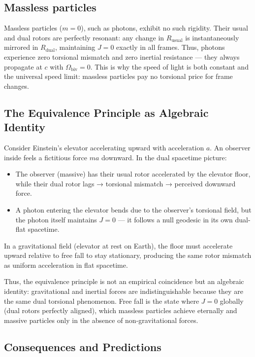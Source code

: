 \documentclass[dvipdfmx,a4paper]{article}
\begin{document}
\subsection{Massless particles}

Massless particles ($m = 0$), such as photons, exhibit no such rigidity. Their usual and dual rotors are perfectly resonant: any change in $R_\text{usual}$ is instantaneously mirrored in $R_\text{dual}$, maintaining $J = 0$ exactly in all frames. Thus, photons experience zero torsional mismatch and zero inertial resistance — they always propagate at $c$ with $\Omega_\text{biv} = 0$. This is why the speed of light is both constant and the universal speed limit: massless particles pay no torsional price for frame changes.

\subsection{The Equivalence Principle as Algebraic Identity}

Consider Einstein's elevator accelerating upward with acceleration $a$. An observer inside feels a fictitious force $ma$ downward. In the dual spacetime picture:

\begin{itemize}
\item The observer (massive) has their usual rotor accelerated by the elevator floor, while their dual rotor lags → torsional mismatch → perceived downward force.
\item A photon entering the elevator bends due to the observer's torsional field, but the photon itself maintains $J = 0$ — it follows a null geodesic in its own dual-flat spacetime.
\end{itemize}

In a gravitational field (elevator at rest on Earth), the floor must accelerate upward relative to free fall to stay stationary, producing the same rotor mismatch as uniform acceleration in flat spacetime.

Thus, the equivalence principle is not an empirical coincidence but an algebraic identity: gravitational and inertial forces are indistinguishable because they are the same dual torsional phenomenon. Free fall is the state where $J = 0$ globally (dual rotors perfectly aligned), which massless particles achieve eternally and massive particles only in the absence of non-gravitational forces.

\subsection{Consequences and Predictions}
\end{document}
